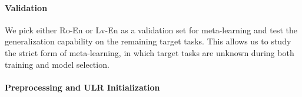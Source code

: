 


\paragraph{Validation}

We pick either Ro-En or Lv-En as a validation set for meta-learning and test the generalization capability on the remaining target tasks. This allows us to study the strict form of meta-learning, in which target tasks are unknown during both training and model selection.




% 




\paragraph{Preprocessing and ULR Initialization}

